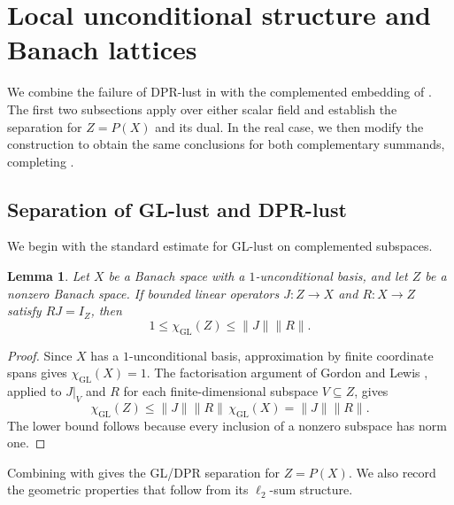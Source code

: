 \documentclass[11pt,a4paper,reqno]{amsart}
\newtheorem{lemma}[lemma]{Lemma}
\theoremstyle{definition}
\newcommand{\norm}[1]{\lVert #1\rVert}
\numberwithin{equation}{section}
\begin{document}
\section{Local unconditional structure and Banach lattices}
\label{sec:lattices}

We combine the failure of DPR-lust in  with the complemented embedding of . The first two subsections apply over either scalar field and establish the separation for $Z=P(X)$ and its dual. In the real case, we then modify the construction to obtain the same conclusions for both complementary summands, completing .

\subsection{Separation of GL-lust and DPR-lust}

We begin with the standard estimate for GL-lust on complemented subspaces.

\begin{lemma}\label{lem:complemented-gl}
Let $X$ be a Banach space with a $1$-unconditional basis, and let $Z$ be a nonzero Banach space. If bounded linear operators $J\colon Z\to X$ and $R\colon X\to Z$ satisfy $RJ=I_Z$, then
\begin{equation*}
 1\leq\chi_{\mathrm{GL}}(Z)\leq\norm J\norm R.
\end{equation*}
\end{lemma}

\begin{proof}
Since $X$ has a $1$-unconditional basis, approximation by finite coordinate spans gives $\chi_{\mathrm{GL}}(X)=1$. The factorisation argument of Gordon and Lewis \cite[Lemma~3.2]{GordonLewis1974}, applied to $J|_V$ and $R$ for each finite-dimensional subspace $V\subseteq Z$, gives
\begin{equation*}
 \chi_{\mathrm{GL}}(Z)\leq\norm J\norm R\,\chi_{\mathrm{GL}}(X)=\norm J\norm R.
\end{equation*}
The lower bound follows because every inclusion of a nonzero subspace has norm one.
\end{proof}

Combining  with  gives the GL/DPR separation for $Z=P(X)$. We also record the geometric properties that follow from its $\ell_2$-sum structure.
\end{document}
